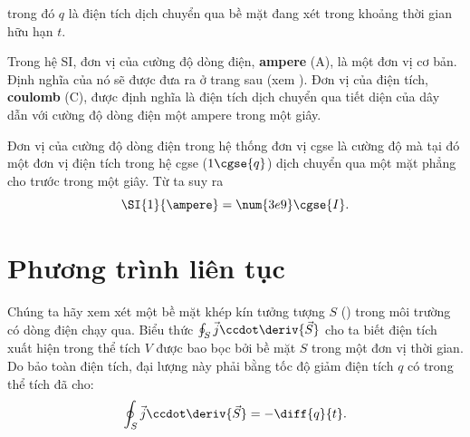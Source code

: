 \noindent
trong đó $q$ là điện tích dịch chuyển qua bề mặt đang xét trong khoảng thời gian hữu hạn $t$.

Trong hệ SI, đơn vị của cường độ dòng điện, \textbf{ampere} (\si{\ampere}), là một đơn vị cơ bản. Định nghĩa của nó sẽ được đưa ra ở trang sau (xem ). Đơn vị của điện tích, \textbf{coulomb} (\si{\coulomb}), được định nghĩa là điện tích dịch chuyển qua tiết diện của dây dẫn với cường độ dòng điện một ampere trong một giây.

Đơn vị của cường độ dòng điện trong hệ thống đơn vị cgse là cường độ mà tại đó một đơn vị điện tích trong hệ cgse ($1 \cgse{q}$) dịch chuyển qua một mặt phẳng cho trước trong một giây. Từ  ta suy ra
\begin{equation}\label{eq:5_8}
    \SI{1}{\ampere} = \num{3e9} \cgse{I}.
\end{equation}

\section{Phương trình liên tục}\label{sec:5_2}

Chúng ta hãy xem xét một bề mặt khép kín tưởng tượng $S$ () trong môi trường có dòng điện chạy qua. Biểu thức $\oint_S\vec{j}\ccdot\deriv{\vec{S}}$ cho ta biết điện tích xuất hiện trong thể tích $V$ được bao bọc bởi bề mặt $S$ trong một đơn vị thời gian. Do bảo toàn điện tích, đại lượng này phải bằng tốc độ giảm điện tích $q$ có trong thể tích đã cho:
\begin{equation*}
    \oint_S \vec{j} \ccdot \deriv{\vec{S}} = - \diff{q}{t}.
\end{equation*}

